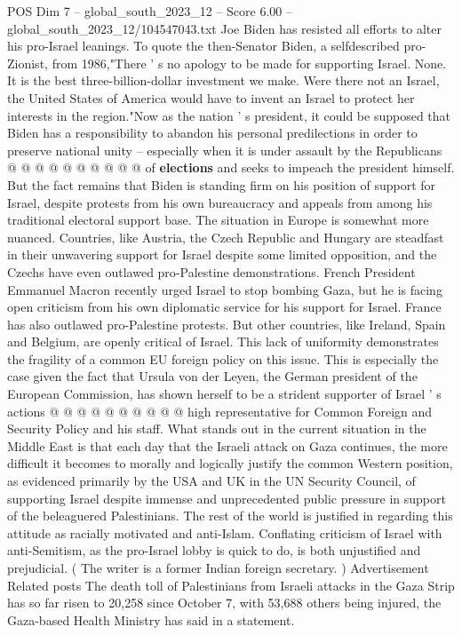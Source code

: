 \begin{textsample}{POS Dim 7 – global\_south\_2023\_12 – Score 6.00 – global\_south\_2023\_12/104547043.txt}
Joe Biden has resisted all efforts to alter his pro-Israel leanings.
To quote the then-Senator Biden, a selfdescribed pro-Zionist, from 1986,"There ' s no apology to be made for supporting Israel.
None.
It is the best three-billion-dollar investment we make.
Were there not an Israel, the United States of America would have to invent an Israel to protect her interests in the region."Now as the nation ' s president, it could be supposed that Biden has a responsibility to abandon his personal predilections in order to preserve national unity -- especially when it is under assault by the Republicans @ @ @ @ @ @ @ @ @ @ of \textbf{elections} and seeks to impeach the president himself.
But the fact remains that Biden is standing firm on his position of support for Israel, despite protests from his own bureaucracy and appeals from among his traditional electoral support base.
The situation in Europe is somewhat more nuanced.
Countries, like Austria, the Czech Republic and Hungary are steadfast in their unwavering support for Israel despite some limited opposition, and the Czechs have even outlawed pro-Palestine demonstrations.
French President Emmanuel Macron recently urged Israel to stop bombing Gaza, but he is facing open criticism from his own diplomatic service for his support for Israel.
France has also outlawed pro-Palestine protests.
But other countries, like Ireland, Spain and Belgium, are openly critical of Israel.
This lack of uniformity demonstrates the fragility of a common EU foreign policy on this issue.
This is especially the case given the fact that Ursula von der Leyen, the German president of the European Commission, has shown herself to be a strident supporter of Israel ' s actions @ @ @ @ @ @ @ @ @ @ high representative for Common Foreign and Security Policy and his staff.
What stands out in the current situation in the Middle East is that each day that the Israeli attack on Gaza continues, the more difficult it becomes to morally and logically justify the common Western position, as evidenced primarily by the USA and UK in the UN Security Council, of supporting Israel despite immense and unprecedented public pressure in support of the beleaguered Palestinians.
The rest of the world is justified in regarding this attitude as racially motivated and anti-Islam.
Conflating criticism of Israel with anti-Semitism, as the pro-Israel lobby is quick to do, is both unjustified and prejudicial. ( The writer is a former Indian foreign secretary. ) Advertisement Related posts The death toll of Palestinians from Israeli attacks in the Gaza Strip has so far risen to 20,258 since October 7, with 53,688 others being injured, the Gaza-based Health Ministry has said in a statement.

\end{textsample}
